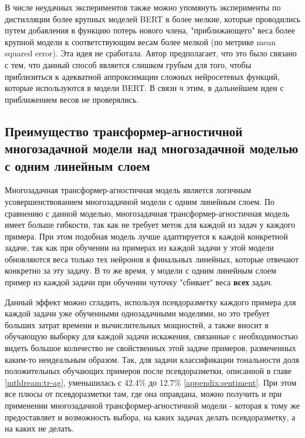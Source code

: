 \begin{itemize}
В числе неудачных экспериментов также можно упомянуть эксперименты по дистилляции более крупных моделей BERT в более мелкие, которые проводились путем добавления в функцию потерь нового члена, "приближающего" веса более крупной модели к соответствующим весам более мелкой (по метрике mean squared error). Эта идея не сработала. Автор предполагает, что это было связано с тем, что данный способ является слишком грубым для того, чтобы приблизиться к адекватной аппроксимации сложных нейросетевых функций, которые используются в модели BERT. В связи ч этим, в дальнейшем идеи с приближением весов не проверялись. 
\subsection{Преимущество трансформер-агностичной многозадачной модели над многозадачной моделью с одним линейным слоем} 
\label{ch:tr-ag:advantages}

Многозадачная трансформер-агностичная модель является логичным усовершенствованием многозадачной модели с одним линейным слоем. По сравнению с данной моделью, многозадачная трансформер-агностичная модель имеет больше гибкости, так как не требует меток для каждой из задач у каждого примера. При этом подобная модель лучше адаптируется к каждой конкретной задаче, так как при обучении на примерах из каждой задачи у этой модели обновляются веса только тех нейронов в финальных линейных, которые отвечают конкретно за эту задачу. В то же время, у модели с одним линейным слоем пример из каждой задачи при обучении чуточку "сбивает" веса \textbf{всех} задач. 

Данный эффект можно сгладить, используя псевдоразметку каждого примера для каждой задачи уже обученными однозадачными моделями, но это требует больших затрат времени и вычислительных мощностей, а также вносит в обучающую выборку для каждой задачи искажения, связанные с необходимостью видеть большое количество не свойственных этой задаче примеров, размеченных каким-то неидеальным образом. Так, для задачи классификации тональности доля положительных обучающих примеров после псевдоразметки, описанной в главе \ref{mtldream:tr-ag}, уменьшилась с 42.4\% до 12.7\% \ref{appendix:sentiment}. При этом все плюсы от псевдоразметки там, где она оправдана, можно получить и при применении многозадачной трансформер-агностичной модели - которая к тому же предоставляет и возможность выбора, на каких задачах делать псевдоразметку, а на каких не делать.


\end{itemize}
